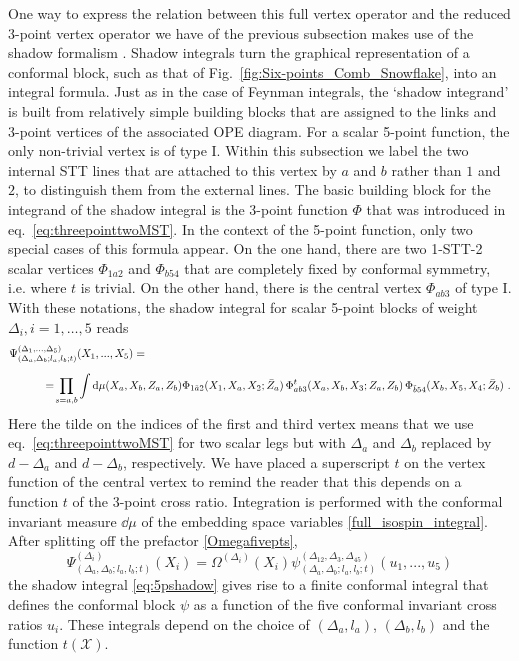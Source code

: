 \documentclass{article}
\begin{document}
One way to express the relation between this full vertex operator and the reduced 3-point 
vertex operator we have of the previous subsection makes use of the shadow formalism \cite{Ferrara:1972uq}. Shadow integrals turn the graphical 
representation of a conformal block, such as that of Fig.~\ref{fig:Six-points_Comb_Snowflake}, into an integral formula. 
Just as in the case of Feynman integrals, the `shadow integrand' is built from 
relatively simple building blocks that are assigned to the links and 3-point vertices 
of the associated OPE diagram. For a scalar 5-point function, the only non-trivial 
vertex is of type I. Within this subsection we label the two internal STT 
lines that are attached to this vertex by $a$ and $b$ rather than $1$ and $2$, to 
distinguish them from the external lines. The basic building block for the integrand 
of the shadow integral is the 3-point function $\Phi$ that was introduced in eq.\ 
\eqref{eq:threepointtwoMST}. In the context of the 5-point function, only two 
special cases of this formula appear. On the one hand, there are two 1-STT-2 scalar 
vertices $\Phi_{1a2}$ and $\Phi_{b54}$ that are completely fixed by conformal 
symmetry, i.e. where $t$ is trivial. On the other hand, there is the central 
vertex  $\Phi_{ab3}$ of type I. With these notations, the shadow integral for 
scalar 5-point blocks of weight $\Delta_i, i=1, \dots,5$ reads
\begin{eqnarray}
\Psi^{(\Delta_1,...,\Delta_5)}_{(\Delta_a,\Delta_b;l_a,l_b;t)} (X_1,...,X_5) & = & 
\label{eq:5pshadow} \\[2mm]
 & & \hspace*{-3.5cm} =\! \prod_{s =a,b} \int \dd \mu(X_a,X_b,Z_a,Z_b) 
  \Phi_{1\tilde{a}2}(X_1,X_a,X_2;\bar{Z}_a) \,  \Phi^t_{ab3}(X_a,X_b,X_3;Z_a,Z_b)
\, \Phi_{\tilde{b}54}(X_b,X_5,X_4;\bar{Z}_b) \ . \nonumber 
\end{eqnarray}
Here the tilde on the indices of the first and third vertex means that we use eq.\
\eqref{eq:threepointtwoMST} for two scalar legs but with $\Delta_a$ and $\Delta_b$ replaced by $d-\Delta_a$ and $d-\Delta_b$, respectively. We have placed a superscript 
$t$ on the vertex function of the central vertex to remind the reader that this depends on a function $t$ of the 3-point cross ratio. Integration is performed with the conformal 
invariant measure $\dd \mu$ of the embedding space variables \eqref{full_isospin_integral}. After splitting off the 
prefactor \eqref{Omegafivepts},
\begin{equation}
\Psi^{(\Delta_i)}_{(\Delta_a,\Delta_b;l_a,l_b;t)} (X_i)  =
\Omega^{(\Delta_i)} (X_i)
\psi^{(\Delta_{12},\Delta_3,\Delta_{45})}_{(\Delta_a,\Delta_b;l_a,l_b;t)}
(u_1,...,u_5)
\end{equation} 
the shadow integral \eqref{eq:5pshadow} gives rise to a finite conformal integral 
that defines the conformal block $\psi$ as a function of the five conformal 
invariant cross ratios $u_i$. These integrals depend on the choice of 
$(\Delta_a,l_a)$, $(\Delta_b,l_b)$ and the function $t(\mathcal{X})$. 
\end{document}
